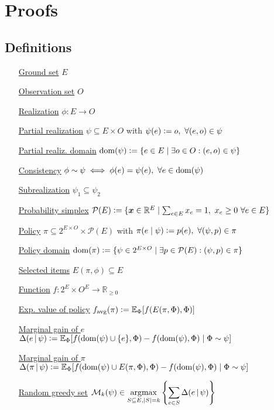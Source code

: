 ﻿\appendix
\chapter{Proofs}

\section{Definitions}

\begin{itemize}
  \item[\underline{Ground set}] $E$
  \item[\underline{Observation set}] $O$
  \item[\underline{Realization}] $\phi : E \to O$
  \item[\underline{Partial realization}] $\psi \subseteq E \times O$ with $\psi(e) \vcentcolon= o,\ \forall (e, o) \in \psi$
  \item[\underline{Partial realiz. domain}] $\operatorname{dom}(\psi) \vcentcolon= \{e \in E \mid \exists o \in O : (e, o) \in \psi\}$
  \item[\underline{Consistency}] $\phi \sim \psi \iff \phi(e) = \psi(e),\ \forall e \in \operatorname{dom}(\psi)$
  \item[\underline{Subrealization}] $\psi_1 \subseteq \psi_2$
  \item[\underline{Probability simplex}] $\mathcal{P}(E) \vcentcolon= \{\bm{x} \in \mathbb{R}^E \mid \sum_{e \in E} x_e = 1,\ x_e \geq 0\ \forall e \in E\}$
  \item[\underline{Policy}] $\pi \subseteq 2^{E \times O} \times \mathcal{P}(E)$ with $\pi(e\mid\psi) \vcentcolon= p(e),\ \forall (\psi, p) \in \pi$
  \item[\underline{Policy domain}] $\operatorname{dom}(\pi) \vcentcolon= \{\psi \in 2^{E \times O} \mid \exists p \in \mathcal{P}(E) : (\psi, p) \in \pi\}$
  \item[\underline{Selected items}] $E(\pi, \phi) \subseteq E$
  \item[\underline{Function}] $f : 2^E \times O^E \to \mathbb{R}_{\geq 0}$
  \item[\underline{Exp. value of policy}] $f_{\mathrm{avg}}(\pi) \vcentcolon= \mathbb{E}_{\Phi}[f(E(\pi, \Phi), \Phi)]$
  \item[\underline{Marginal gain of $e$}] $\Delta(e\,|\,\psi) \vcentcolon= \mathbb{E}_{\Phi}[f(\operatorname{dom}(\psi) \cup \{e\}, \Phi) - f(\operatorname{dom}(\psi), \Phi) \mid \Phi \sim \psi]$
  \item[\underline{Marginal gain of $\pi$}] $\Delta(\pi\,|\,\psi) \vcentcolon= \mathbb{E}_{\Phi}[f(\operatorname{dom}(\psi) \cup E(\pi, \Phi), \Phi) - f(\operatorname{dom}(\psi), \Phi) \mid \Phi \sim \psi]$
  \item[\underline{Random greedy set}] $\mathcal{M}_k(\psi) \in \displaystyle\argmax_{S \subseteq E, |S| = k}\left\{\sum_{e \in S} \D(e\mmid\psi) \right\}$
\end{itemize}


